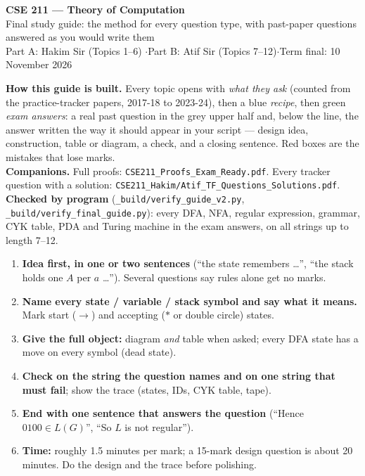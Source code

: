 \documentclass[10.5pt,a4paper]{article}
\begin{document}
\begin{center}
{\Large\bfseries\color{navy} CSE 211 --- Theory of Computation}\\[2pt]
{\large Final study guide: the method for every question type, with past-paper questions answered as you would write them}\\[2pt]
{\small Part A: Hakim Sir (Topics 1--6) \quad$\cdot$\quad Part B: Atif Sir (Topics 7--12)\quad$\cdot$\quad Term final: 10 November 2026}
\end{center}

\begin{tcolorbox}[colback=white,colframe=navy,boxrule=0.4pt,arc=1pt,left=6pt,right=6pt,top=3pt,bottom=3pt]
\textbf{How this guide is built.} Every topic opens with \emph{what they ask} (counted from the practice-tracker papers, 2017-18 to 2023-24),
then a blue \emph{recipe}, then green \emph{exam answers}: a real past question in the grey upper half and, below the line, the answer written the
way it should appear in your script --- design idea, construction, table or diagram, a check, and a closing sentence. Red boxes are the mistakes
that lose marks.\\[2pt]
\textbf{Companions.} Full proofs: \texttt{CSE211\_Proofs\_Exam\_Ready.pdf}. Every tracker question with a solution:
\texttt{CSE211\_Hakim/Atif\_TF\_Questions\_Solutions.pdf}.\\[2pt]
\textbf{Checked by program} (\texttt{\_build/verify\_guide\_v2.py}, \texttt{\_build/verify\_final\_guide.py}): every DFA, NFA, regular expression,
grammar, CYK table, PDA and Turing machine in the exam answers, on all strings up to length 7--12.
\end{tcolorbox}

\begin{recipe}
\begin{enumerate}
\item \textbf{Idea first, in one or two sentences} (``the state remembers \dots'', ``the stack holds one $A$ per $a$ \dots''). Several questions
say rules alone get no marks.
\item \textbf{Name every state / variable / stack symbol and say what it means.} Mark start ($\to$) and accepting ($*$ or double circle) states.
\item \textbf{Give the full object:} diagram \emph{and} table when asked; every DFA state has a move on every symbol (dead state).
\item \textbf{Check on the string the question names and on one string that must fail}; show the trace (states, IDs, CYK table, tape).
\item \textbf{End with one sentence that answers the question} (``Hence $0100\in L(G)$'', ``So $L$ is not regular'').
\item \textbf{Time:} roughly 1.5 minutes per mark; a 15-mark design question is about 20 minutes. Do the design and the trace before polishing.
\end{enumerate}
\end{recipe}
\end{document}

